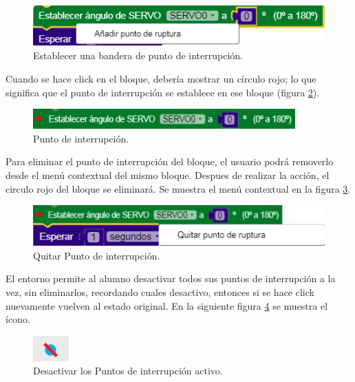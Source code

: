\begin{figure}[!htbp]
	\centering
	\includegraphics[scale=.65]{./Figures/add-breakpoint.PNG}
	\caption{Establecer una bandera de punto de interrupción.}
	\label{fig:add-breakpoint}
\end{figure}

Cuando se hace click en el bloque, debería mostrar un círculo rojo; lo que significa que el punto de interrupción se establece en ese bloque (figura \ref{fig:breakpoint}).

\begin{figure}[!htbp]
	\centering
	\includegraphics[scale=.65]{./Figures/breakpoint.PNG}
	\caption{Punto de interrupción.}
	\label{fig:breakpoint}
\end{figure}

Para eliminar el punto de interrupción del bloque, el usuario podrá removerlo desde el menú contextual del mismo bloque. Despues de realizar la acción, el circulo rojo del bloque se eliminará. Se muestra el menú contextual en la figura \ref{fig:breakpoint-eliminar}.

\begin{figure}[!htbp]
	\centering
	\includegraphics[scale=.65]{./Figures/breakpoint-eliminar.PNG}
	\caption{Quitar Punto de interrupción.}
	\label{fig:breakpoint-eliminar}
\end{figure}

El entorno permite al alumno desactivar todos sus puntos de interrupción a la vez, sin eliminarlos, recordando cuales desactivo, entonces si se hace click nuevamente vuelven al estado original.
En la siguiente figura \ref{fig:desactivar-breakpoints} se muestra el ícono.

\begin{figure}[!htbp]
	\begin{center}  %
		\includegraphics[scale=.80]{./Figures/desactivar-breakpoints.PNG}
		\par\caption{Desactivar los Puntos de interrupción activo.}\label{fig:desactivar-breakpoints}
	\end{center}
\end{figure}


